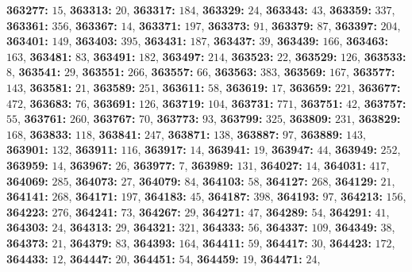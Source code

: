 \textsf{\bfseries 363277:} $15$, \textsf{\bfseries 363313:} $20$, \textsf{\bfseries 363317:} $184$, \textsf{\bfseries 363329:} $24$, \textsf{\bfseries 363343:} $43$, \textsf{\bfseries 363359:} $337$, \textsf{\bfseries 363361:} $356$, \textsf{\bfseries 363367:} $14$, \textsf{\bfseries 363371:} $197$, \textsf{\bfseries 363373:} $91$, \textsf{\bfseries 363379:} $87$, \textsf{\bfseries 363397:} $204$, \textsf{\bfseries 363401:} $149$, \textsf{\bfseries 363403:} $395$, \textsf{\bfseries 363431:} $187$, \textsf{\bfseries 363437:} $39$, \textsf{\bfseries 363439:} $166$, \textsf{\bfseries 363463:} $163$, \textsf{\bfseries 363481:} $83$, \textsf{\bfseries 363491:} $182$, \textsf{\bfseries 363497:} $214$, \textsf{\bfseries 363523:} $22$, \textsf{\bfseries 363529:} $126$, \textsf{\bfseries 363533:} $8$, \textsf{\bfseries 363541:} $29$, \textsf{\bfseries 363551:} $266$, \textsf{\bfseries 363557:} $66$, \textsf{\bfseries 363563:} $383$, \textsf{\bfseries 363569:} $167$, \textsf{\bfseries 363577:} $143$, \textsf{\bfseries 363581:} $21$, \textsf{\bfseries 363589:} $251$, \textsf{\bfseries 363611:} $58$, \textsf{\bfseries 363619:} $17$, \textsf{\bfseries 363659:} $221$, \textsf{\bfseries 363677:} $472$, \textsf{\bfseries 363683:} $76$, \textsf{\bfseries 363691:} $126$, \textsf{\bfseries 363719:} $104$, \textsf{\bfseries 363731:} $771$, \textsf{\bfseries 363751:} $42$, \textsf{\bfseries 363757:} $55$, \textsf{\bfseries 363761:} $260$, \textsf{\bfseries 363767:} $70$, \textsf{\bfseries 363773:} $93$, \textsf{\bfseries 363799:} $325$, \textsf{\bfseries 363809:} $231$, \textsf{\bfseries 363829:} $168$, \textsf{\bfseries 363833:} $118$, \textsf{\bfseries 363841:} $247$, \textsf{\bfseries 363871:} $138$, \textsf{\bfseries 363887:} $97$, \textsf{\bfseries 363889:} $143$, \textsf{\bfseries 363901:} $132$, \textsf{\bfseries 363911:} $116$, \textsf{\bfseries 363917:} $14$, \textsf{\bfseries 363941:} $19$, \textsf{\bfseries 363947:} $44$, \textsf{\bfseries 363949:} $252$, \textsf{\bfseries 363959:} $14$, \textsf{\bfseries 363967:} $26$, \textsf{\bfseries 363977:} $7$, \textsf{\bfseries 363989:} $131$, \textsf{\bfseries 364027:} $14$, \textsf{\bfseries 364031:} $417$, \textsf{\bfseries 364069:} $285$, \textsf{\bfseries 364073:} $27$, \textsf{\bfseries 364079:} $84$, \textsf{\bfseries 364103:} $58$, \textsf{\bfseries 364127:} $268$, \textsf{\bfseries 364129:} $21$, \textsf{\bfseries 364141:} $268$, \textsf{\bfseries 364171:} $197$, \textsf{\bfseries 364183:} $45$, \textsf{\bfseries 364187:} $398$, \textsf{\bfseries 364193:} $97$, \textsf{\bfseries 364213:} $156$, \textsf{\bfseries 364223:} $276$, \textsf{\bfseries 364241:} $73$, \textsf{\bfseries 364267:} $29$, \textsf{\bfseries 364271:} $47$, \textsf{\bfseries 364289:} $54$, \textsf{\bfseries 364291:} $41$, \textsf{\bfseries 364303:} $24$, \textsf{\bfseries 364313:} $29$, \textsf{\bfseries 364321:} $321$, \textsf{\bfseries 364333:} $56$, \textsf{\bfseries 364337:} $109$, \textsf{\bfseries 364349:} $38$, \textsf{\bfseries 364373:} $21$, \textsf{\bfseries 364379:} $83$, \textsf{\bfseries 364393:} $164$, \textsf{\bfseries 364411:} $59$, \textsf{\bfseries 364417:} $30$, \textsf{\bfseries 364423:} $172$, \textsf{\bfseries 364433:} $12$, \textsf{\bfseries 364447:} $20$, \textsf{\bfseries 364451:} $54$, \textsf{\bfseries 364459:} $19$, \textsf{\bfseries 364471:} $24$, 
